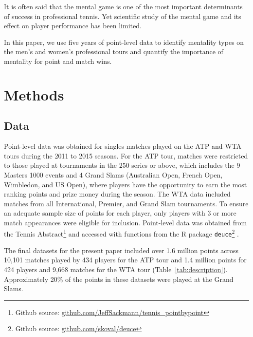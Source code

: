 \documentclass{Latex/svjour3}
\begin{document}
It is often said that the mental game is one of the most important
determinants of success in professional tennis. Yet scientific study
of the mental game and its effect on player performance has been limited.

In this paper, we use five years of point-level data to identify
mentality types on the men's and women's professional tours and
quantify the importance of mentality for point and match wins. 

\section{Methods}

\subsection{Data}

Point-level data was obtained for singles matches played on the ATP
and WTA tours during the 2011 to 2015 seasons. For the ATP tour, matches
were restricted to those played at tournaments in the 250 series or above, which
includes the 9 Masters 1000 events and 4 Grand Slams (Australian Open,
French Open, Wimbledon, and US Open),
where players have the opportunity to earn the most ranking points and
prize money during the season. The WTA data included matches from all
International, Premier, and Grand Slam tournaments. To ensure an
adequate sample size of points for each player, only players with 3 or
more match appearances were eligible for inclusion. Point-level data
was obtained from the Tennis Abstract\footnote{Github source: \url{github.com/JeffSackmann/tennis_pointbypoint}} and accessed with functions from
the R package \texttt{deuce}\footnote{Github source: \url{github.com/skoval/deuce}} .

The final datasets for the present paper included over 1.6 million
points across 10,101 matches played by 434 players for the ATP tour
and 1.4 million points for 424 players and 9,668 matches
for the WTA tour (Table~\ref{tab:description}). Approximately 20\% of
the points in these datasets were played at the Grand Slams. 
\end{document}
